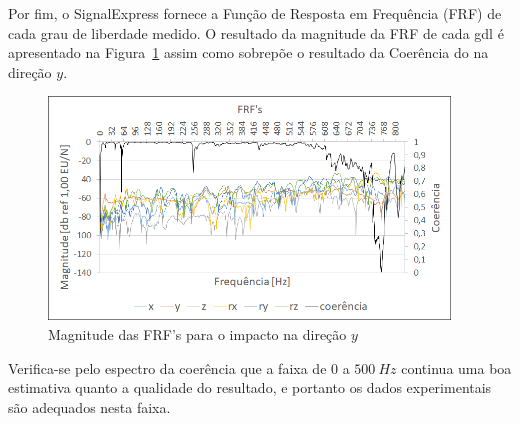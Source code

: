 Por fim, o SignalExpress fornece a Função de Resposta em Frequência (FRF) de
cada grau de liberdade medido. O resultado da magnitude da FRF de cada gdl é
apresentado na Figura~\ref{fig::frfs} assim como sobrepõe o resultado da
Coerência do na direção $y$.

\begin{figure}[h]
	\centering 
 	\includegraphics[width=0.95\textwidth]{figs/frfs}
 	\caption{Magnitude das FRF's para o impacto na direção $y$}
 	\label{fig::frfs}
\end{figure}

Verifica-se pelo espectro da coerência que a faixa de $0$ a $500~Hz$
continua uma boa estimativa quanto a qualidade do resultado, e portanto os dados
experimentais são adequados nesta faixa.








